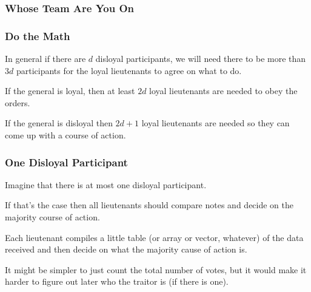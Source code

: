 \begin{frame}
\frametitle{Whose Team Are You On}

\begin{center}
\end{center}

\end{frame}

\begin{frame}
\frametitle{Do the Math}

In general if there are $d$ disloyal participants, we will need there to be more than $3d$ participants for the loyal lieutenants to agree on what to do. 

If the general is loyal, then at least $2d$ loyal lieutenants are needed to obey the orders.

If the general is disloyal then $2d+1$ loyal lieutenants are needed so they can come up with a course of action.

\end{frame}


\begin{frame}
\frametitle{One Disloyal Participant}

Imagine that there is at most one disloyal participant. 

If that's the case then all lieutenants should compare notes and decide on the majority course of action. 

Each lieutenant compiles a little table (or array or vector, whatever) of the data received and then decide on what the majority cause of action is. 

It might be simpler to just count the total number of votes, but it would make it harder to figure out later who the traitor is (if there is one).

\end{frame}


